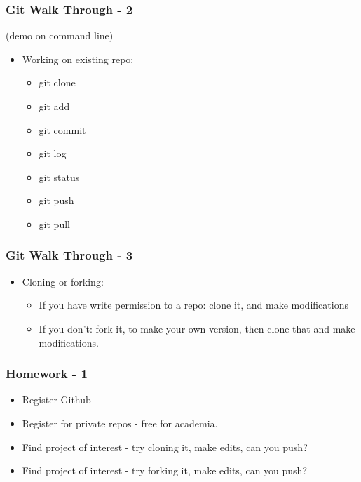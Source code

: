 \hypertarget{git-walk-through---2}{%
\subsubsection{Git Walk Through - 2}\label{git-walk-through---2}}

(demo on command line)

\begin{itemize}
\tightlist
\item
  Working on existing repo:

  \begin{itemize}
  \tightlist
  \item
    git clone
  \item
    git add
  \item
    git commit
  \item
    git log
  \item
    git status\\
  \item
    git push
  \item
    git pull
  \end{itemize}
\end{itemize}

\hypertarget{git-walk-through---3}{%
\subsubsection{Git Walk Through - 3}\label{git-walk-through---3}}

\begin{itemize}
\tightlist
\item
  Cloning or forking:

  \begin{itemize}
  \tightlist
  \item
    If you have write permission to a repo: clone it, and make
    modifications
  \item
    If you don't: fork it, to make your own version, then clone that and
    make modifications.
  \end{itemize}
\end{itemize}

\hypertarget{homework---1}{%
\subsubsection{Homework - 1}\label{homework---1}}

\begin{itemize}
\tightlist
\item
  Register Github
\item
  Register for private repos - free for academia.
\item
  Find project of interest - try cloning it, make edits, can you push?
\item
  Find project of interest - try forking it, make edits, can you push?
\end{itemize}

